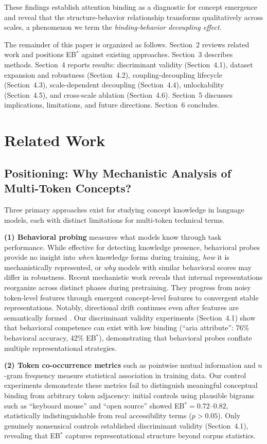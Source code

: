 \documentclass[10pt]{article} %
\begin{document}
These findings establish attention binding as a diagnostic for concept emergence and reveal that the structure-behavior relationship transforms qualitatively across scales, a phenomenon we term the \emph{binding-behavior decoupling effect}.

The remainder of this paper is organized as follows.
Section~2 reviews related work and positions EB$^*$ against existing approaches.
Section~3 describes methods.
Section~4 reports results: discriminant validity (Section~4.1), dataset expansion and robustness (Section~4.2), coupling-decoupling lifecycle (Section~4.3), scale-dependent decoupling (Section~4.4), unlockability (Section~4.5), and cross-scale ablation (Section~4.6).
Section~5 discusses implications, limitations, and future directions.
Section~6 concludes.

\section{Related Work}

\subsection{Positioning: Why Mechanistic Analysis of Multi-Token Concepts?}

Three primary approaches exist for studying concept knowledge in language models, each with distinct limitations for multi-token technical terms.

\textbf{(1) Behavioral probing} \citep{meng2022locating,olsson2022context} measures what models know through task performance.
While effective for detecting knowledge presence, behavioral probes provide no insight into \emph{when} knowledge forms during training, \emph{how} it is mechanistically represented, or \emph{why} models with similar behavioral scores may differ in robustness.
Recent mechanistic work reveals that internal representations reorganize across distinct phases during pretraining. They progress from noisy token-level features through emergent concept-level features to convergent stable representations. Notably, directional drift continues even after features are semantically formed \citep{xu2025tracking}.
Our discriminant validity experiments (Section~4.1) show that behavioral competence can exist with low binding (``aria attribute'': 76\% behavioral accuracy, 42\% EB$^*$), demonstrating that behavioral probes conflate multiple representational strategies.

\textbf{(2) Token co-occurrence metrics} such as pointwise mutual information and $n$-gram frequency measure statistical association in training data.
Our control experiments demonstrate these metrics fail to distinguish meaningful conceptual binding from arbitrary token adjacency: initial controls using plausible bigrams such as ``keyboard mouse'' and ``open source'' showed EB$^*=0.72$--$0.82$, statistically indistinguishable from real accessibility terms ($p>0.05$).
Only genuinely nonsensical controls established discriminant validity (Section~4.1), revealing that EB$^*$ captures representational structure beyond corpus statistics.
\end{document}
